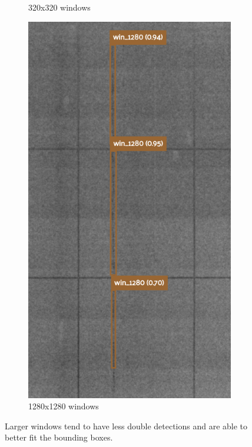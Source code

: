 \begin{figure}[!h]
\begin{subfigure}{.5\textwidth}
  \caption{320x320 windows}
\end{subfigure}%
\begin{subfigure}{.5\textwidth}
  \centering
  \includegraphics[width=\linewidth]{images/implementation/results/win/1280}
  \caption{1280x1280 windows}
\end{subfigure}
\caption{Larger windows tend to have less double detections and are able to better fit the bounding boxes.}
\label{impl:win_bb_compare}
\end{figure}


